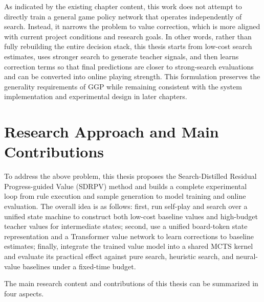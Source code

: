 As indicated by the existing chapter content, this work does not attempt to directly train a general game policy network that operates independently of search. Instead, it narrows the problem to value correction, which is more aligned with current project conditions and research goals. In other words, rather than fully rebuilding the entire decision stack, this thesis starts from low-cost search estimates, uses stronger search to generate teacher signals, and then learns correction terms so that final predictions are closer to strong-search evaluations and can be converted into online playing strength. This formulation preserves the generality requirements of GGP while remaining consistent with the system implementation and experimental design in later chapters.


\section{Research Approach and Main Contributions}


To address the above problem, this thesis proposes the Search-Distilled Residual Progress-guided Value (SDRPV) method and builds a complete experimental loop from rule execution and sample generation to model training and online evaluation. The overall idea is as follows: first, run self-play and search over a unified state machine to construct both low-cost baseline values and high-budget teacher values for intermediate states; second, use a unified board-token state representation and a Transformer value network to learn corrections to baseline estimates; finally, integrate the trained value model into a shared MCTS kernel and evaluate its practical effect against pure search, heuristic search, and neural-value baselines under a fixed-time budget.


The main research content and contributions of this thesis can be summarized in four aspects.

